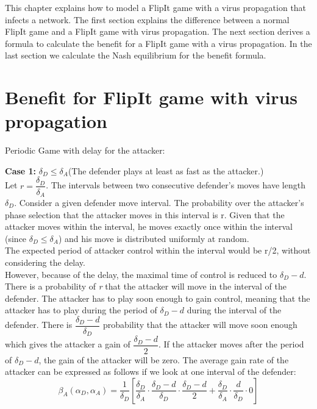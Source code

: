 This chapter explains how to model a FlipIt game with a virus propagation that infects a network. The first section explains the difference between a normal FlipIt game and a FlipIt game with virus propagation. The next section derives a formula to calculate the benefit for a FlipIt game with a virus propagation. In the last section we calculate the Nash equilibrium for the benefit formula.




\section{Benefit for FlipIt game with virus propagation}

Periodic Game with delay for the attacker:

\textbf{Case 1:} $\delta_{D} \leq \delta_{A} $(The defender plays at least as fast as the attacker.) \\

Let $r = \dfrac{\delta_{D}}{ \delta_{A} }$. The intervals between two consecutive defender's moves have length $\delta_{D}$. Consider a given defender move interval. The probability over the attacker's phase selection that the attacker moves in this interval is r. Given that the attacker moves within the interval, he moves exactly once within the interval (since $\delta_{D} \leq \delta_{A} $) and his move is distributed uniformly at random. \\

The expected period of attacker control within the interval would be r/2, without considering the delay. \\

However, because of the delay, the maximal time of control is reduced to $\delta_{D}-d$. There is a probability of \textit{r} that the attacker will move in the interval of the defender. The attacker has to play soon enough to gain control, meaning that the attacker has to play during the period of $\delta_{D}-d$ during the interval of the defender. There is $\dfrac{\delta_{D}-d}{\delta_{D}}$ probability that the attacker will move soon enough which gives the attacker a gain of $\dfrac{\delta_{D}-d}{2}$. If the attacker moves after the period of $\delta_{D}-d$, the gain of the attacker will be zero. The average gain rate of the attacker can be expressed as follows if we look at one interval of the defender:
\begin{equation}\label{first}
\beta_{A}(\alpha_{D},\alpha_{A}) = \dfrac {1}{\delta_{D}} [ \dfrac{\delta_{D}}{\delta_{A}} \cdot \dfrac{\delta_{D}-d}{\delta_{D}} \cdot \dfrac{\delta_{D}-d}{2} + \dfrac{\delta_{D}}{\delta_{A}} \cdot \dfrac{d}{\delta_{D}} \cdot 0 ]
\end{equation}


